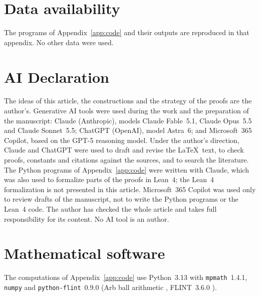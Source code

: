 \documentclass[11pt,a4paper]{article}
\makeatletter
\numberwithin{equation}{section}
\DeclareRobustCommand{\CGref}[1]{\ref{#1}}
\DeclareRobustCommand{\CGcite}[2][]{\if\relax\detokenize{#1}\relax\cite{#2}\else\cite[#1]{#2}\fi}
\let\CG@origref\ref
\newcommand{\CG@gettip}[1]{\@ifundefined{CGTip@#1}{#1}{\csname CGTip@#1\endcsname}}
\newcommand{\CG@getbib}[1]{\@ifundefined{CGBib@#1}{#1}{\csname CGBib@#1\endcsname}}
\DeclareRobustCommand{\CGref}[1]{\pdftooltip{\CG@origref{#1}}{\CG@gettip{#1}}}
\DeclareRobustCommand{\CGcite}[2][]{\pdftooltip{\if\relax\detokenize{#1}\relax\cite{#2}\else\cite[#1]{#2}\fi}{\CG@getbib{#2}}}
\theoremstyle{definition}
\theoremstyle{remark}
\makeatother
\begin{document}
\section*{Data availability}
The programs of Appendix~\CGref{app:code} and their outputs are reproduced in that appendix. No other data were used.

\section*{AI Declaration}
The ideas of this article, the constructions and the strategy of the proofs are the author's. Generative AI tools were used during the work and the preparation of the manuscript: Claude (Anthropic), models Claude Fable~5.1, Claude Opus~5.5 and Claude Sonnet~5.5; ChatGPT (OpenAI), model Astra~6; and Microsoft~365 Copilot, based on the GPT-5 reasoning model. Under the author's direction, Claude and ChatGPT were used to draft and revise the \LaTeX\ text, to check proofs, constants and citations against the sources, and to search the literature. The Python programs of Appendix~\CGref{app:code} were written with Claude, which was also used to formalize parts of the proofs in Lean~4; the Lean~4 formalization is not presented in this article. Microsoft~365 Copilot was used only to review drafts of the manuscript, not to write the Python programs or the Lean~4 code. The author has checked the whole article and takes full responsibility for its content. No AI tool is an author.

\section*{Mathematical software}
The computations of Appendix~\CGref{app:code} use Python~3.13 with \texttt{mpmath}~1.4.1, \texttt{numpy} and \texttt{python-flint}~0.9.0 (Arb ball arithmetic \CGcite{Johansson2017}, FLINT~3.6.0 \CGcite{FLINT}).
\end{document}
